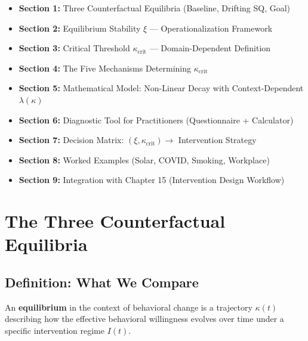 \documentclass[11pt, a4paper]{article}
\begin{document}
\begin{itemize}
    \item \textbf{Section 1:} Three Counterfactual Equilibria (Baseline, Drifting SQ, Goal)
    \item \textbf{Section 2:} Equilibrium Stability $\xi$ — Operationalization Framework
    \item \textbf{Section 3:} Critical Threshold $\kappa_{\text{crit}}$ — Domain-Dependent Definition
    \item \textbf{Section 4:} The Five Mechanisms Determining $\kappa_{\text{crit}}$
    \item \textbf{Section 5:} Mathematical Model: Non-Linear Decay with Context-Dependent $\lambda(\kappa)$
    \item \textbf{Section 6:} Diagnostic Tool for Practitioners (Questionnaire + Calculator)
    \item \textbf{Section 7:} Decision Matrix: $(\xi, \kappa_{\text{crit}}) \to$ Intervention Strategy
    \item \textbf{Section 8:} Worked Examples (Solar, COVID, Smoking, Workplace)
    \item \textbf{Section 9:} Integration with Chapter 15 (Intervention Design Workflow)
\end{itemize}


\section{The Three Counterfactual Equilibria}

\subsection{Definition: What We Compare}

An \textbf{equilibrium} in the context of behavioral change is a trajectory $\kappa(t)$
describing how the effective behavioral willingness evolves over time under a specific
intervention regime $I(t)$.
\end{document}

